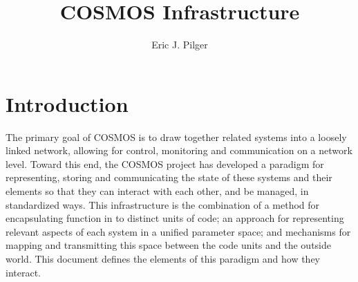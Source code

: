 \documentclass[10pt,letterpaper]{report}
\title{COSMOS Infrastructure}
\author{Eric J. Pilger}
\begin{document}
\maketitle
\tableofcontents

\chapter{Introduction}
The primary goal of COSMOS is to draw together related systems into a loosely linked network, allowing for control, monitoring and communication on a network level. Toward this end, the COSMOS project has developed a paradigm for representing, storing and communicating the state of these systems and their elements so that they can interact with each other, and be managed, in standardized ways. This infrastructure is the combination of a method for encapsulating function in to distinct units of code; an approach for representing relevant aspects of each system in a unified parameter space; and mechanisms for mapping and transmitting this space between the code units and the outside world. This document defines the elements of this paradigm and how they interact.
\end{document}
